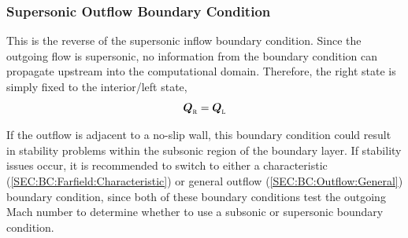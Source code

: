 \subsubsection{Supersonic Outflow Boundary Condition}
\label{SEC:BC:Outflow:Supersonic}

This is the reverse of the supersonic inflow boundary condition.
%
Since the outgoing flow is supersonic, no information from the boundary
condition can propagate upstream into the computational domain.
%
Therefore, the right state is simply fixed to the interior\slash left state,
\thatis
%
\begin{equation*}
  \cvVecR = \cvVecL
\end{equation*}


If the outflow is adjacent to a no-slip wall, this boundary condition could
result in stability problems within the subsonic region of the boundary layer.
%
If stability issues occur, it is recommended to switch to either a
characteristic (\ref{SEC:BC:Farfield:Characteristic}) or
general outflow (\ref{SEC:BC:Outflow:General}) boundary condition, since both of
these boundary conditions test the outgoing Mach number to determine whether to
use a subsonic or supersonic boundary condition.


